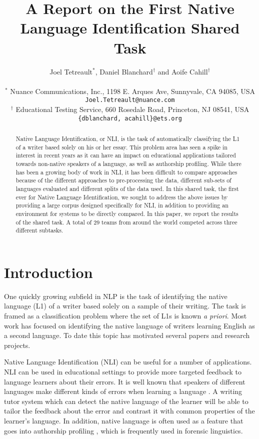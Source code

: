 \documentclass[11pt,letterpaper]{article}
\title{A Report on the First Native Language Identification Shared Task}
\author{Joel Tetreault$^{*}$, Daniel Blanchard$^{\dag}$ and Aoife Cahill$^{\dag}$\\
\\
  { $^{*}$ Nuance Communications, Inc., 1198 E. Arques Ave, Sunnyvale, CA 94085, USA}\\
  { {\tt Joel.Tetreault@nuance.com}} \\
  { $^{\dag}$ Educational Testing Service, 660 Rosedale Road, Princeton, NJ 08541, USA}\\
  { {\tt \{dblanchard, acahill\}@ets.org}}\\
}
\date{}
\begin{document}
\maketitle
\begin{abstract}
Native Language Identification, or NLI, is the task of automatically classifying
the L1 of a writer based solely on his or her essay.  This problem area has
seen a spike in interest in recent years as it can have an impact on
educational applications tailored towards non-native speakers of a language,
as well as authorship profiling.  
While there has been a growing body of work in NLI, it has been difficult to compare 
approaches because of the different approaches to pre-processing the data, different 
sub-sets of languages evaluated and different splits of the data used.
In this shared task, the first
ever for Native Language Identification, we sought to
address the above issues by providing a large corpus designed specifically for NLI,
in addition to providing an environment for systems to be directly compared.
In this paper, we report the results of the shared task.
A total of 29 teams from around the world competed across
three different subtasks.
\end{abstract}

\section{Introduction}
\label{sec-intro}
One quickly growing subfield in NLP is the task of identifying the native
language (L1) of a writer based solely on a sample of their writing. The task
is framed as a classification problem where the set of L1s is known \emph{a priori}.
Most work has focused on identifying the native language of writers
learning English as a second language. To date this topic has motivated
several papers and research projects.

Native Language Identification (NLI) can be useful for a number of
applications. NLI can be used in educational settings to provide more
targeted feedback to language learners about their errors. It is
well known that speakers of different languages make different kinds of
errors when learning a language \cite{SwanSmith01}. A writing tutor system
which can detect the native language of the learner will be able to tailor
the feedback about the error and contrast it with common
properties of the learner's language. In addition, native language is
often used as a feature that goes into authorship profiling
\cite{estival2007author}, which is frequently used in forensic linguistics.
\end{document}
